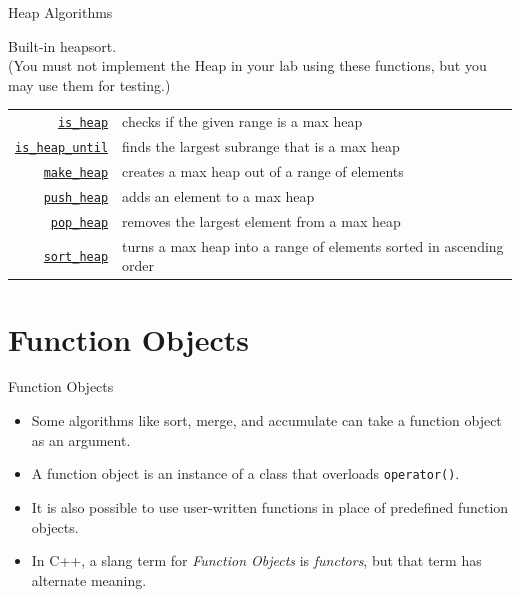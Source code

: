 \documentclass[14pt,aspectratio=1610]{beamer}
\begin{document}
\begin{frame}{Heap Algorithms}

Built-in heapsort.\\
(You must not implement the Heap in your lab using these functions, but you may use them for testing.)

\footnotesize\renewcommand{\ULdepth}{3pt}\renewcommand{\arraystretch}{1.3}
\begin{tabularx}{\textwidth}{r X}
\href{https://en.cppreference.com/w/cpp/algorithm/is_heap}{\lstinline{is_heap}} &
  checks if the given range is a max heap\\
\href{https://en.cppreference.com/w/cpp/algorithm/is_heap_until}{\lstinline{is_heap_until}} &
  finds the largest subrange that is a max heap\\
\href{https://en.cppreference.com/w/cpp/algorithm/make_heap}{\lstinline{make_heap}} &
  creates a max heap out of a range of elements\\
\href{https://en.cppreference.com/w/cpp/algorithm/push_heap}{\lstinline{push_heap}} &
  adds an element to a max heap\\
\href{https://en.cppreference.com/w/cpp/algorithm/pop_heap}{\lstinline{pop_heap}} &
  removes the largest element from a max heap\\
\href{https://en.cppreference.com/w/cpp/algorithm/sort_heap}{\lstinline{sort_heap}} &
  turns a max heap into a range of elements sorted in ascending order\\
\end{tabularx}
\end{frame}

\section{Function Objects}
\begin{frame}{Function Objects}
\begin{itemize}
\item
  Some algorithms like sort, merge, and accumulate can take a function object as an argument.
\item
  A function object is an instance of a class that overloads \lstinline{operator()}.
\item
  It is also possible to use user-written functions in place of predefined function objects.
\item
  In C++, a slang term for \textit{Function Objects} is \emph{functors}, but that term has alternate meaning.
\end{itemize}
\end{frame}
\end{document}
